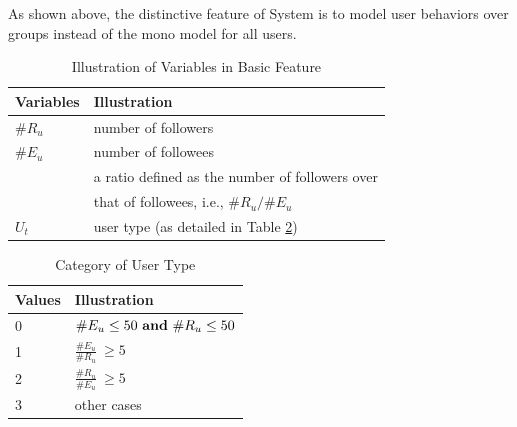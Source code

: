 As shown above, the distinctive feature of System  \sys{} is to model user \retg{} behaviors over groups instead of the mono model for all users.

\begin{table}[tb!]
\centering
\begin{small}
\caption{Illustration of Variables in Basic Feature}
\vspace{0.3cm}
\label{tbl:fe-info}
\begin{tabular}{ll}
\toprule
\multicolumn{1}{l}{\textbf{Variables}} & \multicolumn{1}{l}{\textbf{Illustration}}	\\	\midrule \midrule
\#$R_u$				& number of followers				\\	\midrule
\#$E_u$				& number of followees				\\	\midrule
                    & a ratio defined as the number of followers over \\
\raisebox{1.5ex}{$R_{ee}$}  & that of followees, i.e., ${\#R_u}/{\#E_u}$ \\  \midrule
$U_t$					& user type (as detailed in Table \ref{tbl:ucate})			\\ \bottomrule
\end{tabular}
\end{small}
\vspace{-3ex}
\end{table}
\begin{table}[tb!]
\centering
\begin{small}
\caption{Category of User Type}
\vspace{0.3cm}
\label{tbl:ucate}
\begin{tabular}{ll}
\toprule
\multicolumn{1}{l}{\textbf{Values}} & \multicolumn{1}{l}{\textbf{Illustration}}	\\	\midrule \midrule
0                       & $\#E_u \le 50 \ {\bf and} \ \#R_u \le 50$				\\	\midrule
\multirow{2}{*}{1}      & \multirow{2}{*}{$\frac{\#E_u}{\#R_u} \ \ge 5$}	\\
 						&                       									\\	\midrule
\multirow{2}{*}{2}		& \multirow{2}{*}{$\frac{\#R_u}{\#E_u} \ \ge 5$}  \\
						&															\\	\midrule
3                   	& other cases 												\\ \bottomrule
\end{tabular}
\end{small}
\end{table}


